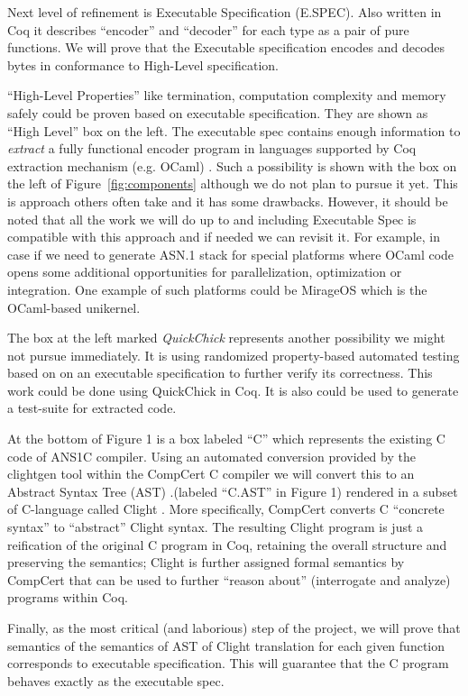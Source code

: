 \documentclass[acmsmall,nonacm]{acmart}
\begin{document}
Next level of refinement is Executable Specification (E.SPEC). Also
written in Coq it describes ``encoder'' and ``decoder'' for each type
as a pair of pure functions. We will prove that the Executable
specification encodes and decodes bytes in conformance to High-Level
specification.

``High-Level Properties'' like termination, computation complexity and
memory safely could be proven based on executable specification. They
are shown as ``High Level'' box on the left. The executable spec
contains enough information to \textit{extract} a fully functional
encoder program in languages supported by Coq extraction mechanism
(e.g. OCaml) \cite{TODO:26}. Such a possibility is shown with the box
on the left of Figure~\ref{fig:components} although we do not plan to
pursue it yet. This is approach others often take and it has some
drawbacks. However, it should be noted that all the work we will do up
to and including Executable Spec is compatible with this approach and
if needed we can revisit it. For example, in case if we need to
generate ASN.1 stack for special platforms where OCaml code opens some
additional opportunities for parallelization, optimization or
integration. One example of such platforms could be MirageOS
\cite{TODO:27} which is the OCaml-based unikernel.

The box at the left marked \textit{QuickChick} represents another
possibility we might not pursue immediately. It is using randomized
property-based automated testing based on on an executable
specification to further verify its correctness. This work could be
done using QuickChick \cite{TODO:28} in Coq. It is also could be used
to generate a test-suite for extracted code.

At the bottom of Figure 1 is a box labeled ``C'' which represents the
existing C code of ANS1C compiler. Using an automated conversion
provided by the clightgen tool within the CompCert C compiler
\cite{TODO:3} we will convert this to an Abstract Syntax Tree (AST)
\cite{TODO:29} .(labeled ``C.AST'' in Figure 1) rendered in a subset
of C-language called Clight \cite{TODO:30}. More specifically,
CompCert converts C ``concrete syntax'' to ``abstract'' Clight
syntax. The resulting Clight program is just a reification of the
original C program in Coq, retaining the overall structure and
preserving the semantics; Clight is further assigned formal semantics
by CompCert that can be used to further ``reason about'' (interrogate
and analyze) programs within Coq.

Finally, as the most critical (and laborious) step of the project, we
will prove that semantics of the semantics of AST of Clight
translation for each given function corresponds to executable
specification. This will guarantee that the C program behaves exactly
as the executable spec.
\end{document}
